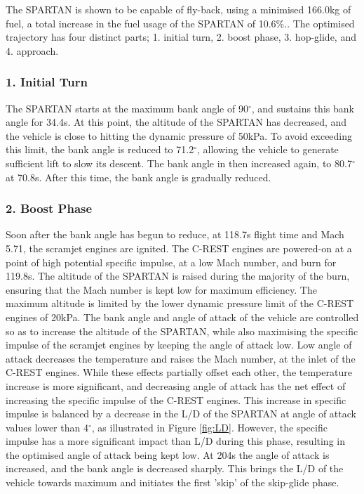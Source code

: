 \documentclass[conf]{new-aiaa}
\begin{document}
The SPARTAN is shown to be capable of fly-back, using a minimised 166.0kg of fuel, a total increase in the fuel usage of the SPARTAN of 10.6\%..
The optimised trajectory has four distinct parts; 1. initial turn, 2. boost phase, 3. hop-glide, and 4. approach. 

\subsubsection{1. Initial Turn}
The SPARTAN starts at the maximum bank angle of 90$^\circ$, and sustains this bank angle for 34.4s. At this point, the altitude of the SPARTAN has decreased, and the vehicle is close to hitting the dynamic pressure of 50kPa. To avoid exceeding this limit, the bank angle is reduced to 71.2$^\circ$, allowing the vehicle to generate sufficient lift to slow its descent. The bank angle in then increased again, to 80.7$^\circ$ at 70.8s. After this time, the bank angle is gradually reduced. 

\subsubsection{2. Boost Phase}
Soon after the bank angle has begun to reduce, at 118.7s flight time and Mach 5.71, the scramjet engines are ignited. The C-REST engines are powered-on at a point of high potential specific impulse, at a low Mach number, and burn for 119.8s. The altitude of the SPARTAN is raised during the majority of the burn, ensuring that the Mach number is kept low for maximum efficiency\cite{Preller2017}. The maximum altitude is limited by the lower dynamic pressure limit of the C-REST engines of 20kPa. The bank angle and angle of attack of the vehicle are controlled so as to increase the altitude of the SPARTAN, while also maximising the specific impulse of the scramjet engines by keeping the angle of attack low. Low angle of attack decreases the temperature and raises the Mach number, at the inlet of the C-REST engines. While these effects partially offset each other\cite{Preller2017}, the temperature increase is more significant, and decreasing angle of attack has the net effect of increasing the specific impulse of the C-REST engines. This increase in specific impulse is balanced by a decrease in the L/D of the SPARTAN at angle of attack values lower than 4$^\circ$, as illustrated in Figure \ref{fig:LD}. However, the specific impulse has a more significant impact than L/D during this phase, resulting in the optimised angle of attack being kept low. At 204s the angle of attack is increased, and the bank angle is decreased sharply. This brings the L/D of the vehicle towards maximum and initiates the first 'skip' of the skip-glide phase.  
\end{document}
